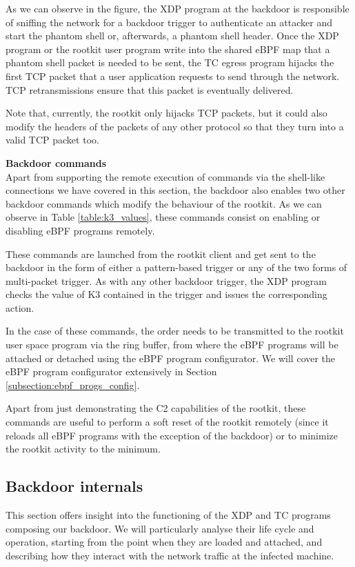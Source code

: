 As we can observe in the figure, the XDP program at the backdoor is responsible of sniffing the network for a backdoor trigger to authenticate an attacker and start the phantom shell or, afterwards, a phantom shell header. Once the XDP program or the rootkit user program write into the shared eBPF map that a phantom shell packet is needed to be sent, the TC egress program hijacks the first TCP packet that a user application requests to send through the network. TCP retransmissions ensure that this packet is eventually delivered.

Note that, currently, the rootkit only hijacks TCP packets, but it could also modify the headers of the packets of any other protocol so that they turn into a valid TCP packet too.


\textbf{Backdoor commands}\\
Apart from supporting the remote execution of commands via the shell-like connections we have covered in this section, the backdoor also enables two other backdoor commands which modify the behaviour of the rootkit. As we can observe in Table \ref{table:k3_values}, these commands consist on enabling or disabling eBPF programs remotely.

These commands are launched from the rootkit client and get sent to the backdoor in the form of either a pattern-based trigger or any of the two forms of multi-packet trigger. As with any other backdoor trigger, the XDP program checks the value of K3 contained in the trigger and issues the corresponding action.

In the case of these commands, the order needs to be transmitted to the rootkit user space program via the ring buffer, from where the eBPF programs will be attached or detached using the eBPF program configurator. We will cover the eBPF program configurator extensively in Section \ref{subsection:ebpf_progs_config}.

Apart from just demonstrating the C2 capabilities of the rootkit, these commands are useful to perform a soft reset of the rootkit remotely (since it reloads all eBPF programs with the exception of the backdoor) or to minimize the rootkit activity to the minimum.


\subsection{Backdoor internals}
This section offers insight into the functioning of the XDP and TC programs composing our backdoor. We will particularly analyse their life cycle and operation, starting from the point when they are loaded and attached, and describing how they interact with the network traffic at the infected machine.

